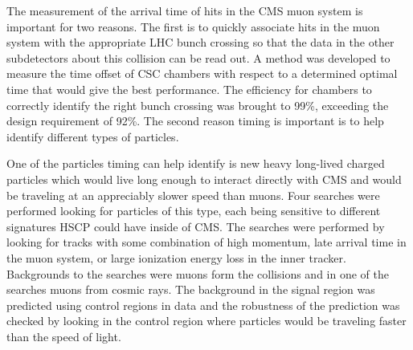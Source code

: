 
The measurement of the arrival time of hits in the CMS muon system is important for two reasons.
The first is to quickly associate hits in the muon system with the appropriate LHC bunch crossing so that the data in the other subdetectors about this
collision can be read out. A method was developed to measure the time offset of CSC chambers with respect to a determined optimal time that would give
the best performance. 
The efficiency for chambers to correctly identify the right bunch crossing was brought to 99\%,
exceeding the design requirement of 92\%. The second reason timing is important is to help identify different types of particles.

One of the particles timing can help identify is new heavy long-lived charged particles which would live long enough to interact directly with CMS
and would be traveling at an appreciably slower speed than muons. Four searches were performed looking
for particles of this type, each being sensitive to different signatures HSCP could have inside of CMS. 
The searches were performed by looking for tracks with some combination of high momentum, late arrival time in the muon system,
or large ionization energy loss in the inner tracker.
Backgrounds to the searches were muons form the collisions and in one of the searches muons from cosmic rays.
The background in the signal region was predicted using control regions in data and the 
robustness of the prediction was checked by looking in the control region where particles would be traveling faster than the speed of light.

